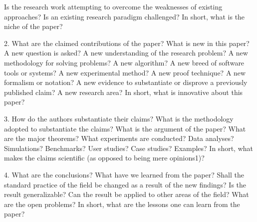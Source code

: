 Is the research work attempting to overcome the weaknesses of existing approaches?
Is an existing research paradigm challenged? In short, what is the niche of the paper?

2. What are the claimed contributions of the paper? What is new in this paper?
A new question is asked?
A new understanding of the research problem?
A new methodology for solving problems?
A new algorithm?
A new breed of software tools or systems?
A new experimental method?
A new proof technique?
A new formalism or notation?
A new evidence to substantiate or disprove a previously published claim?
A new research area?
In short, what is innovative about this paper?

3. How do the authors substantiate their claims?
What is the methodology adopted to substantiate the claims?
What is the argument of the paper? What are the major theorems?
What experiments are conducted?
Data analyses?
Simulations?
Benchmarks?
User studies?
Case studies?
Examples?
In short, what makes the claims scientific (as opposed to being mere opinions1)?

4. What are the conclusions?
What have we learned from the paper?
Shall the standard practice of the field be changed as a result of the new findings?
Is the result generalizable?
Can the result be applied to other areas of the field?
What are the open problems?
In short, what are the lessons one can learn from the paper?
